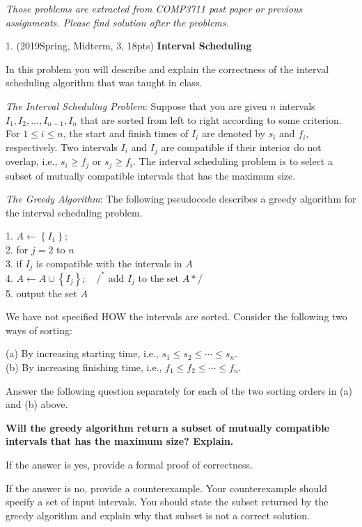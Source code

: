 \begin{spacing}{1.3}
    {\it Those problems are extracted from COMP3711 past paper or previous assignments. 
    Please find solution after the problems.}

    1. (2019Spring, Midterm, 3, 18pts) {\bf Interval Scheduling}
    
    In this problem you will describe and explain the correctness of the interval scheduling algorithm that was taught in class.
    
    {\it The Interval Scheduling Problem}: Suppose that you are given $n$ intervals $I_{1}, I_{2}, \ldots, I_{n-1}, I_{n}$ that are sorted from left to right according to some criterion. For $1 \leq i \leq n$, the start and finish times of $I_{i}$ are denoted by $s_{i}$ and $f_{i}$, respectively. Two intervals $I_{i}$ and $I_{j}$ are compatible if their interior do not overlap, i.e., $s_{i} \geq f_{j}$ or $s_{j} \geq f_{i}$. The interval scheduling problem is to select a subset of mutually compatible intervals that has the maximum size.
    
    {\it The Greedy Algorithm}: The following pseudocode describes a greedy algorithm for the interval scheduling problem.
    
    1. $A \leftarrow\left\{I_{1}\right\}$;\\
    2. for $j=2$ to $n$\\
    3. \quad if $I_{j}$ is compatible with the intervals in $A$\\
    4. \quad \quad \quad $A \leftarrow A \cup\left\{I_{j}\right\} ; \quad /^{*}$ add $I_{j}$ to the set $A * /$\\
    5. output the set $A$

    We have not specified HOW the intervals are sorted. Consider the following two ways of sorting:
    
    \noindent (a) By increasing starting time, i.e., $s_{1} \leq s_{2} \leq \cdots \leq s_{n}$.\\
    (b) By increasing finishing time, i.e., $f_{1} \leq f_{2} \leq \cdots \leq f_{n}$.
    
    Answer the following question separately for each of the two sorting orders in (a) and (b) above.
    
    {\bf Will the greedy algorithm return a subset of mutually compatible intervals that has the maximum size? Explain.}
    
    If the answer is yes, provide a formal proof of correctness.
    
    If the answer is no, provide a counterexample. Your counterexample should specify a set of input intervals. You should state the subset returned by the greedy algorithm and explain why that subset is not a correct solution.



\end{spacing}
